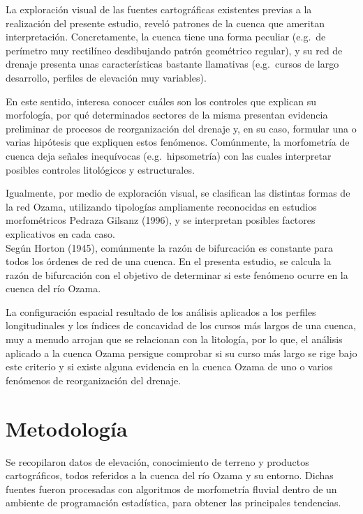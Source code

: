 \documentclass[11pt,]{article}
\begin{document}
La exploración visual de las fuentes cartográficas existentes previas a
la realización del presente estudio, reveló patrones de la cuenca que
ameritan interpretación. Concretamente, la cuenca tiene una forma
peculiar (e.g.~de perímetro muy rectilíneo desdibujando patrón
geométrico regular), y su red de drenaje presenta unas características
bastante llamativas (e.g.~cursos de largo desarrollo, perfiles de
elevación muy variables).

En este sentido, interesa conocer cuáles son los controles que explican
su morfología, por qué determinados sectores de la misma presentan
evidencia preliminar de procesos de reorganización del drenaje y, en su
caso, formular una o varias hipótesis que expliquen estos fenómenos.
Comúnmente, la morfometría de cuenca deja señales inequívocas
(e.g.~hipsometría) con las cuales interpretar posibles controles
litológicos y estructurales.

Igualmente, por medio de exploración visual, se clasifican las distintas
formas de la red Ozama, utilizando tipologías ampliamente reconocidas en
estudios morfométricos Pedraza Gilsanz (1996), y se interpretan posibles
factores explicativos en cada caso.\\
Según Horton (1945), comúnmente la razón de bifurcación es constante
para todos los órdenes de red de una cuenca. En el presenta estudio, se
calcula la razón de bifurcación con el objetivo de determinar si este
fenómeno ocurre en la cuenca del río Ozama.

La configuración espacial resultado de los análisis aplicados a los
perfiles longitudinales y los índices de concavidad de los cursos más
largos de una cuenca, muy a menudo arrojan que se relacionan con la
litología, por lo que, el análisis aplicado a la cuenca Ozama persigue
comprobar si su curso más largo se rige bajo este criterio y si existe
alguna evidencia en la cuenca Ozama de uno o varios fenómenos de
reorganización del drenaje.

\section{Metodología}\label{metodologuxeda}

Se recopilaron datos de elevación, conocimiento de terreno y productos
cartográficos, todos referidos a la cuenca del río Ozama y su entorno.
Dichas fuentes fueron procesadas con algoritmos de morfometría fluvial
dentro de un ambiente de programación estadística, para obtener las
principales tendencias.
\end{document}
